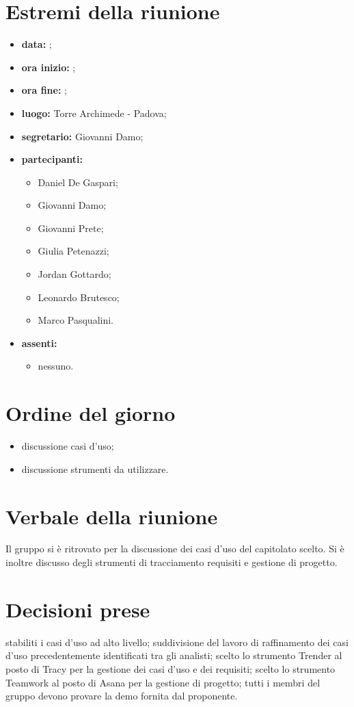 \documentclass[a4paper,11pt]{article}
\begin{document}
	\section{Estremi della riunione}
	\begin{itemize}
		\item \textbf{data:} ;
		\item \textbf{ora inizio:} ;
		\item \textbf{ora fine:} ;
		\item \textbf{luogo:} Torre Archimede - Padova;
		\item \textbf{segretario:} Giovanni Damo;
		\item \textbf{partecipanti:}
			\begin{itemize}
				\item Daniel De Gaspari;
				\item Giovanni Damo;
				\item Giovanni Prete;
				\item Giulia Petenazzi;
				\item Jordan Gottardo;
				\item Leonardo Brutesco;
				\item Marco Pasqualini.
			\end{itemize}
		\item \textbf{assenti:}
			\begin{itemize}
			 \item nessuno.
			\end{itemize}
	\end{itemize}
	\section{Ordine del giorno}
	\begin{itemize}
		\item discussione casi d'uso;
		\item discussione strumenti da utilizzare.
	\end{itemize}
	\section{Verbale della riunione}
	Il gruppo si è ritrovato per la discussione dei casi d'uso del capitolato scelto. Si è inoltre discusso degli strumenti di tracciamento requisiti e gestione di progetto.
	\section{Decisioni prese}
	\begin{itemize}
		\itemVI stabiliti i casi d'uso ad alto livello;
		\itemVI suddivisione del lavoro di raffinamento dei casi d'uso precedentemente identificati tra gli analisti;
		\itemVI scelto lo strumento Trender al posto di Tracy per la gestione dei casi d'uso e dei requisiti;
		\itemVI scelto lo strumento Teamwork al posto di Asana per la gestione di progetto;
		\itemVI tutti i membri del gruppo devono provare la demo fornita dal proponente.
	\end{itemize}
\end{document}
